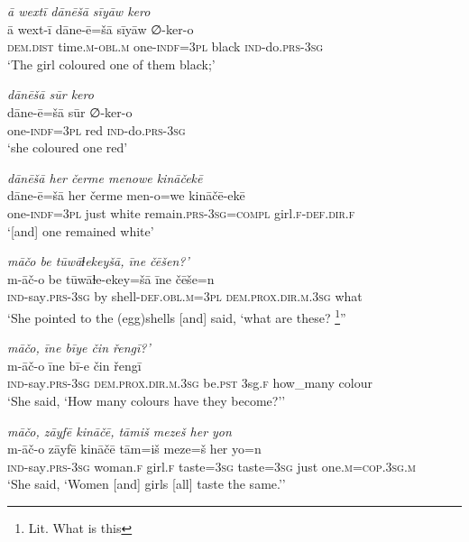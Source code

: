 \ea \label{ŽH.83}
\textit{ā wextī dānēšā sīyāw kero} \\ 
\gll ā wext-ī dāne-ē=šā sīyāw ∅-ker-o \\ 
 \textsc{dem.dist} time\textsc{.m}\textsc{-obl}\textsc{.m} one\textsc{-indf}\textsc{=3pl} black \textsc{ind-}do\textsc{.prs}\textsc{-3sg} \\ 
\glt `The girl coloured one of them black;'
\z 
 
\ea \label{ŽH.84}
\textit{dānēšā sūr kero} \\ 
\gll dāne-ē=šā sūr ∅-ker-o \\ 
 one\textsc{-indf}\textsc{=3pl} red \textsc{ind-}do\textsc{.prs}\textsc{-3sg} \\ 
\glt `she coloured one red'
\z 
 
\ea \label{ŽH.85}
\textit{dānēšā her čerme menowe kināčekē} \\ 
\gll dāne-ē=šā her čerme men-o=we kināčē-ekē \\ 
 one\textsc{-indf}\textsc{=3pl} just white remain\textsc{.prs}\textsc{-3sg}\textsc{=compl} girl\textsc{\textsc{.f}}\textsc{-def}\textsc{.dir}\textsc{\textsc{.f}} \\ 
\glt `[and] one remained white'
\z 
 
\ea \label{ŽH.86}
\textit{māčo be tūwāɫekeyšā, īne čēšen?’} \\ 
\gll m-āč-o be tūwāɫe-ekey=šā īne čēše=n \\ 
 \textsc{ind-}say\textsc{.prs}\textsc{-3sg} by shell\textsc{-def}\textsc{.obl}\textsc{.m}\textsc{=3pl} \textsc{dem.prox}\textsc{.dir}\textsc{.m}\textsc{.3sg} what \\ 
\glt `She pointed to the (egg)shells [and] said, ‘what are these? \footnote{Lit. What is this}''
\z 
 
\ea \label{ŽH.88}
\textit{māčo, īne bīye čin řengī?’} \\ 
\gll m-āč-o īne bī-e čin řengī \\ 
 \textsc{ind-}say\textsc{.prs}\textsc{-3sg} \textsc{dem.prox}\textsc{.dir}\textsc{.m}\textsc{.3sg} be\textsc{.pst} 3sg\textsc{\textsc{.f}} how\_many colour \\ 
\glt `She said, ‘How many colours have they become?’'
\z 
 
\ea \label{ŽH.99}
\textit{māčo, zāyfē kināčē, tāmiš mezeš her yon} \\ 
\gll m-āč-o zāyfē kināčē tām=iš meze=š her yo=n \\ 
 \textsc{ind-}say\textsc{.prs}\textsc{-3sg} woman\textsc{\textsc{.f}} girl\textsc{\textsc{.f}} taste\textsc{=3sg} taste\textsc{=3sg} just one\textsc{.m}\textsc{=cop}\textsc{.3sg}\textsc{.m} \\ 
\glt `She said,  ‘Women [and] girls [all] taste the same.’'
\z 
 
